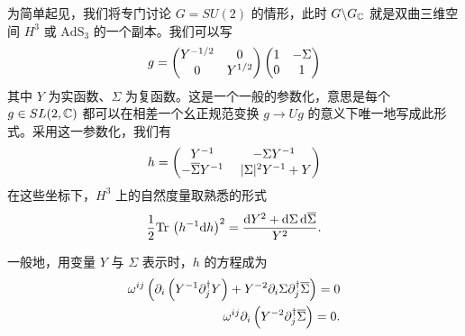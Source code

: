 为简单起见，我们将专门讨论 $G=SU(2)$ 的情形，此时 $G\backslash G_\C$ 就是双曲三维空间 $H^3$ 或 $\mathrm{AdS}_3$ 的一个副本。我们可以写
\begin{equation}\label{firstparam} g= \begin{pmatrix} 
Y^{-1/2} & 0 \cr 0 & Y^{1/2}\end{pmatrix} 
\begin{pmatrix} 1 & -\Sigma \cr 0 & 1\end{pmatrix}   \end{equation}
其中 $Y$ 为实函数、$\Sigma$ 为复函数。这是一个一般的参数化，意思是每个 $g\in SL(2,\C)$ 都可以在相差一个幺正规范变换 $g\to Ug$ 的意义下唯一地写成此形式。采用这一参数化，我们有
\begin{equation}\label{param}
h = \begin{pmatrix} Y^{-1} & -\Sigma Y^{-1}  \cr - \bar \Sigma Y^{-1} &~
 |\Sigma|^2 Y^{-1} + Y \end{pmatrix} 
\end{equation}
在这些坐标下，$H^3$ 上的自然度量取熟悉的形式
\begin{equation}\label{hypmetric}
\frac{1}{2} \mathrm{Tr} \,\left( h^{-1} \d h\right)^2 = \frac{\d Y^2 +  \d\Sigma \,\d\bar \Sigma}{Y^2}.
\end{equation}


一般地，用变量 $Y$ 与 $\Sigma$ 表示时，$h$ 的方程成为
\begin{align}\label{twoq}
\omega^{ij}\left(\partial_i\left( Y^{-1} \partial^\dagger_j Y \right)+ 
Y^{-2} \partial_i\Sigma \partial^\dagger_j \bar \Sigma \right)=0 \cr \omega^{ij}
\partial_i  \left(Y^{-2} \partial^\dagger_j \bar \Sigma \right)=0.
\end{align} 

